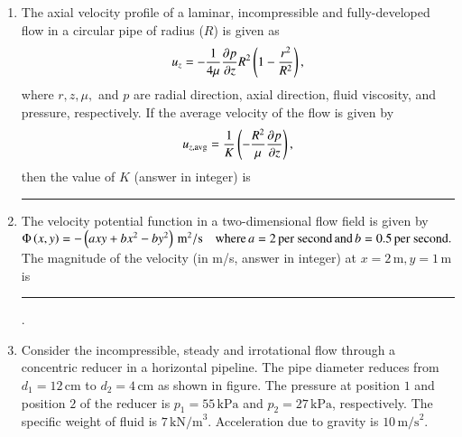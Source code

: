 \documentclass[journal]{IEEEtran}
\begin{document}
\begin{enumerate}[start=40]

\item The axial velocity profile of a laminar, incompressible and fully-developed flow in a circular pipe of radius ($ R $) is given as 
\begin{align*}
    u_z = -\frac{1}{4\mu} \frac{\partial p}{\partial z} R^2 \left( 1 - \frac{r^2}{R^2} \right),
\end{align*}  
where $r, z, \mu, $ and $ p $ are radial direction, axial direction, fluid viscosity, and pressure, respectively. If the average velocity of the flow is given by 
\begin{align*}
    u_{z,\text{avg}} = \frac{1}{K} \left( -\frac{R^2}{\mu} \frac{\partial p}{\partial z} \right), 
\end{align*} 
then the value of $ K $ (answer in integer) is 
 \rule{1cm}{0.4 pt}


\item The velocity potential function in a two-dimensional flow field is given by\\
$ \Phi\left(x, y\right) = -\left(axy + bx^2 - by^2\right) \, \text{m}^2/\text{s} \quad \text{where} \, a = 2 \, \text{per second} \, \text{and} \, b = 0.5 \, \text{per second}. $
The magnitude of the velocity (in m/s, answer in integer) at $ x = 2 \, \text{m}, y = 1 \, \text{m} $ is \rule{1cm}{0.4 pt}.



\item Consider the incompressible, steady and irrotational flow through a concentric reducer in a horizontal pipeline. The pipe diameter reduces from $ d_1 = 12 \, \text{cm} $ to $ d_2 = 4 \, \text{cm} $ as shown in figure. The pressure at position $1$ and position $2$ of the reducer is $ p_1 = 55 \, \text{kPa} $ and $ p_2 = 27 \, \text{kPa}$, respectively. The specific weight of fluid is $ 7 \, \text{kN/m}^3 $. Acceleration due to gravity is $ 10 \, \text{m/s}^2 $.

\begin{center}
\end{center}
\end{enumerate}
\end{document}
